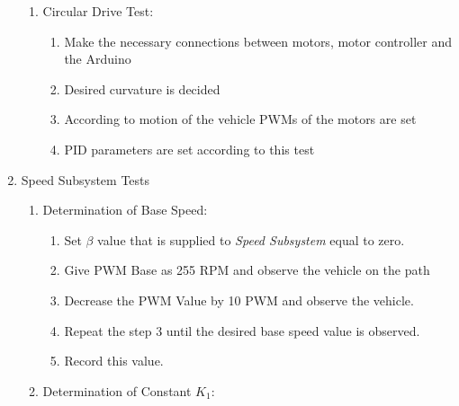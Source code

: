 \documentclass[a4paper,12pt]{article}
\begin{document}
\begin{enumerate}
\begin{enumerate}
\item Circular Drive Test: \label{test:b1}	

\begin{enumerate}

\item Make the necessary connections between motors, motor controller and the Arduino  

\item Desired curvature is decided  

\item  According to motion of the vehicle PWMs of the motors are set  

\item  PID parameters are set according to this test

\end{enumerate}



\end{enumerate}





\item {Speed Subsystem Tests}

\begin{enumerate}

\item Determination of Base Speed: \label{test:a2}	

\begin{enumerate}

\item Set $\beta$ value that is supplied to \textit{Speed Subsystem} equal to zero.

\item Give PWM Base as 255 RPM and observe the vehicle on the path 

\item Decrease the PWM Value by 10 PWM and observe the vehicle.

\item Repeat the step 3 until the desired base speed value is observed.

\item Record this value.

\end{enumerate}


\item Determination of Constant $K_1$:

\begin{enumerate}


\end{enumerate}
\end{enumerate}
\end{enumerate}
\end{document}
